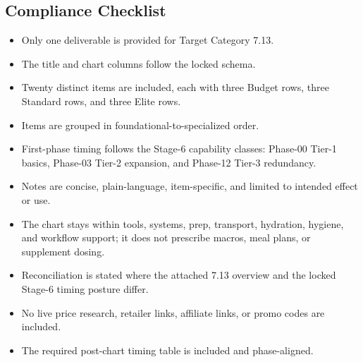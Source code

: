 \documentclass[10pt]{article}
\begin{document}
\subsection*{Compliance Checklist}
{}

\begin{itemize}
\item Only one deliverable is provided for Target Category 7.13.
\item The title and chart columns follow the locked schema.
\item Twenty distinct items are included, each with three Budget rows, three Standard rows, and three Elite rows.
\item Items are grouped in foundational-to-specialized order.
\item First-phase timing follows the Stage-6 capability classes: Phase-00 Tier-1 basics, Phase-03 Tier-2 expansion, and Phase-12 Tier-3 redundancy.
\item Notes are concise, plain-language, item-specific, and limited to intended effect or use.
\item The chart stays within tools, systems, prep, transport, hydration, hygiene, and workflow support; it does not prescribe macros, meal plans, or supplement dosing.
\item Reconciliation is stated where the attached 7.13 overview and the locked Stage-6 timing posture differ.
\item No live price research, retailer links, affiliate links, or promo codes are included.
\item The required post-chart timing table is included and phase-aligned.
\end{itemize}
\end{document}
